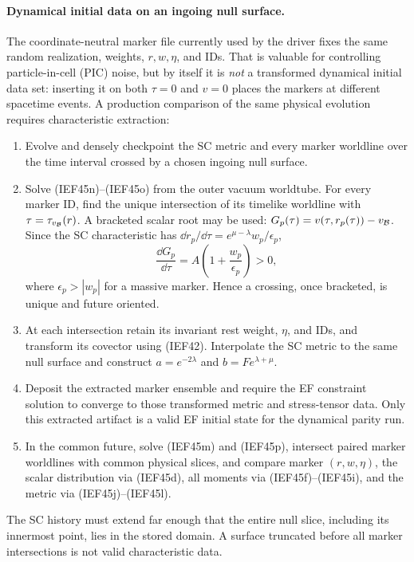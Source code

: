 \paragraph{Dynamical initial data on an ingoing null surface.}
The coordinate-neutral marker file currently used by the driver fixes the
same random realization, weights, \(r,w,\eta\), and IDs.  That is valuable
for controlling particle-in-cell (PIC) noise, but by itself it is
\emph{not} a transformed
dynamical initial data set: inserting it on both \(\tau=0\) and \(v=0\)
places the markers at different spacetime events.  A production comparison of the same physical evolution requires
characteristic extraction:
\begin{enumerate}
\item Evolve and densely checkpoint the SC metric and every marker worldline
      over the time interval crossed by a chosen ingoing null surface.
\item Solve (IEF45n)--(IEF45o) from the outer vacuum worldtube.  For every
      marker ID, find the unique intersection of its timelike worldline with
      \(\tau=\tau_{v_{\cal B}}(r)\).  A bracketed scalar root may be used:
      \(G_p(\tau)=v(\tau,r_p(\tau))-v_{\cal B}\).  Since the SC
      characteristic has
      \(\dd r_p/\dd\tau=e^{\mu-\lambda}w_p/\epsilon_p\),
      \[
       \frac{\dd G_p}{\dd\tau}
       =A\left(1+\frac{w_p}{\epsilon_p}\right)>0,     \tag{IEF45u}
      \]
      where \(\epsilon_p>|w_p|\) for a massive marker.  Hence a crossing,
      once bracketed, is unique and future oriented.
\item At each intersection retain its invariant rest weight, \(\eta\), and
      IDs, and transform its covector using (IEF42).  Interpolate the SC metric
      to the same null surface and construct \(a=e^{-2\lambda}\) and
      \(b=F e^{\lambda+\mu}\).
\item Deposit the extracted marker ensemble and require the EF constraint
      solution to converge to those transformed metric and stress-tensor
      data.  Only this extracted artifact is a valid EF initial state for the
      dynamical parity run.
\item In the common future, solve (IEF45m) and (IEF45p), intersect paired
      marker worldlines with common physical slices, and compare marker
      \((r,w,\eta)\), the scalar distribution via (IEF45d), all moments via
      (IEF45f)--(IEF45i), and the metric via (IEF45j)--(IEF45l).
\end{enumerate}
The SC history must extend far enough that the entire null slice, including
its innermost point, lies in the stored domain.  A surface truncated before
all marker intersections is not valid characteristic data.

